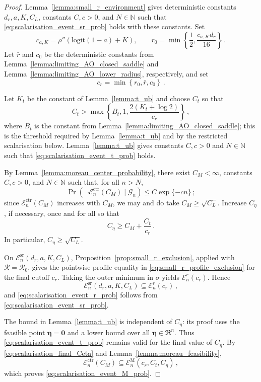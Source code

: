 \documentclass{article}
\theoremstyle{definition}
\newcommand*{\bb}{\boldsymbol}
\newcommand{\logit}[1]{\ensuremath{\textrm{logit}(#1)}}
\begin{document}
\begin{bibunit}
\begin{proof}
Lemma~\ref{lemma:small_r_environment} gives deterministic constants
$d_r,a,K,C_L$, constants $C,c>0$, and
$N\in\mathbb N$ such that
\eqref{eq:scalarisation_event_sr_prob} holds with these constants. Set
$$
	c_{a,K}
	=
	\rho''(\logit{1-a}+K),
	\qquad
	r_0
	=
	\min\left\{
		\frac12,
		\frac{c_{a,K} d_r}{16}
	\right\}\,.
$$
Let $\bar r$ and $c_0$ be the deterministic constants from
Lemma~\ref{lemma:limiting_AO_closed_saddle} and
Lemma~\ref{lemma:limiting_AO_lower_radius}, respectively, and set
$$
	c_r
	=
	\min\left\{
		r_0,
		\bar r,
		c_0
	\right\}\,.
$$

Let $K_t$ be the constant of Lemma~\ref{lemma:t_ub} and choose $C_t$ so that
\begin{equation}
\label{eq:scalarisation_Ct_choice}
	C_t
	>
	\max\left\{
		B_t,
		1,
		\frac{2(K_t+\log2)}{c_r}
	\right\}\,,
\end{equation}
where $B_t$ is the constant from
Lemma~\ref{lemma:limiting_AO_closed_saddle}; this is the threshold required by Lemma~\ref{lemma:t_ub} and by the restricted scalarisation below. Lemma~\ref{lemma:t_ub} gives constants
$C,c>0$ and $N\in\mathbb N$ such that
\eqref{eq:scalarisation_event_t_prob} holds.

By Lemma~\ref{lemma:moreau_center_probability}, there exist
$C_M<\infty$, constants $C,c>0$, and
$N\in\mathbb N$ such that, for all $n>N$,
$$
	\Pr\left(
		\lnot\mathcal E_n^{\mathrm{ctr}}(C_M)
		\mid
		\mathcal G_n
	\right)
	\leq
	C\exp\{-cn\}\,;
$$
since $\mathcal E_n^{\mathrm{ctr}}(C_M)$ increases with $C_M$, we may and do take $C_M\geq\sqrt{C_L}$. Increase $C_\eta$, if
necessary, once and for all so that
\begin{equation}
\label{eq:scalarisation_final_Ceta}
	C_\eta
	\geq
	C_M+
	\frac{C_t}{c_r}\,.
\end{equation}
In particular, $C_\eta\geq\sqrt{C_L}$.

On $\mathcal E_n^{\mathrm{sr}}(d_r,a,K,C_L)$,
Proposition~\ref{prop:small_r_exclusion}, applied with
$\mathcal R=\mathcal R_0$, gives the pointwise profile equality in
\eqref{eq:small_r_profile_exclusion} for the final cutoff $c_r$. Taking the
outer minimum in $\sigma$ yields $\mathcal E_n^r(c_r)$. Hence
$$
	\mathcal E_n^{\mathrm{sr}}(d_r,a,K,C_L)
	\subseteq
	\mathcal E_n^r(c_r)\,,
$$
and \eqref{eq:scalarisation_event_r_prob} follows from
\eqref{eq:scalarisation_event_sr_prob}.

The bound in Lemma~\ref{lemma:t_ub} is independent of $C_\eta$: its proof
uses the feasible point $\bb\eta=\bb0$ and a lower bound over all
$\bb\eta\in\Re^n$. Thus
\eqref{eq:scalarisation_event_t_prob} remains valid for the final value of
$C_\eta$. By \eqref{eq:scalarisation_final_Ceta} and
Lemma~\ref{lemma:moreau_feasibility},
$$
	\mathcal E_n^{\mathrm{ctr}}(C_M)
	\subseteq
	\mathcal E_n^{\mathrm M}(c_r,C_t,C_\eta)\,,
$$
which proves \eqref{eq:scalarisation_event_M_prob}.


\end{proof}
\end{bibunit}
\end{document}
